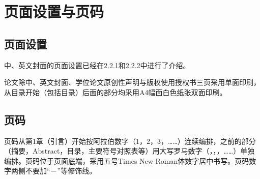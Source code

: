 \section{页面设置与页码}

\subsection{页面设置}

中、英文封面的页面设置已经在2.2.1和2.2.2中进行了介绍。

论文除中、英文封面、学位论文原创性声明与版权使用授权书三页采用单面印刷，从目录开始（包括目录）后面的部分均采用A4幅面白色纸张双面印刷。

\subsection{页码}

页码从第1章（引言）开始按阿拉伯数字（1，2，3，……）连续编排，之前的部分（摘要，Abstract，目录，主要符号对照表等）用大写罗马数字（，，，……）单独编排。页码位于页面底端，采用五号Times New Roman体数字居中书写。页码数字两侧不要加“－”等修饰线。